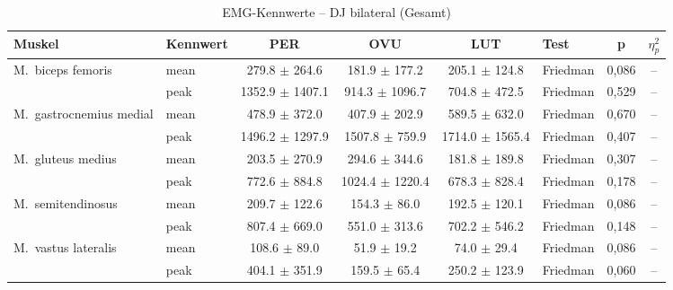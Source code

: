 \begin{table}[H]
  \centering
  \caption{EMG-Kennwerte – DJ bilateral (Gesamt)}
  \label{tab:DJ_bilateral_Gesamt}
  \small
  \begin{tabular}{l l c c c l c c}
    \hline
    \textbf{Muskel} & \textbf{Kennwert} & \textbf{PER} & \textbf{OVU} & \textbf{LUT} & \textbf{Test} & \textbf{p} & \textbf{$\eta^2_p$} \\
    \hline
    M.~biceps femoris & mean & 279.8 $\pm$ 264.6 & 181.9 $\pm$ 177.2 & 205.1 $\pm$ 124.8 & Friedman & 0{,}086 & -- \\
     & peak & 1352.9 $\pm$ 1407.1 & 914.3 $\pm$ 1096.7 & 704.8 $\pm$ 472.5 & Friedman & 0{,}529 & -- \\
    \hline
    M.~gastrocnemius medial & mean & 478.9 $\pm$ 372.0 & 407.9 $\pm$ 202.9 & 589.5 $\pm$ 632.0 & Friedman & 0{,}670 & -- \\
     & peak & 1496.2 $\pm$ 1297.9 & 1507.8 $\pm$ 759.9 & 1714.0 $\pm$ 1565.4 & Friedman & 0{,}407 & -- \\
    \hline
    M.~gluteus medius & mean & 203.5 $\pm$ 270.9 & 294.6 $\pm$ 344.6 & 181.8 $\pm$ 189.8 & Friedman & 0{,}307 & -- \\
     & peak & 772.6 $\pm$ 884.8 & 1024.4 $\pm$ 1220.4 & 678.3 $\pm$ 828.4 & Friedman & 0{,}178 & -- \\
    \hline
    M.~semitendinosus & mean & 209.7 $\pm$ 122.6 & 154.3 $\pm$ 86.0 & 192.5 $\pm$ 120.1 & Friedman & 0{,}086 & -- \\
     & peak & 807.4 $\pm$ 669.0 & 551.0 $\pm$ 313.6 & 702.2 $\pm$ 546.2 & Friedman & 0{,}148 & -- \\
    \hline
    M.~vastus lateralis & mean & 108.6 $\pm$ 89.0 & 51.9 $\pm$ 19.2 & 74.0 $\pm$ 29.4 & Friedman & 0{,}086 & -- \\
     & peak & 404.1 $\pm$ 351.9 & 159.5 $\pm$ 65.4 & 250.2 $\pm$ 123.9 & Friedman & 0{,}060 & -- \\
    \hline
  \end{tabular}
\end{table}

